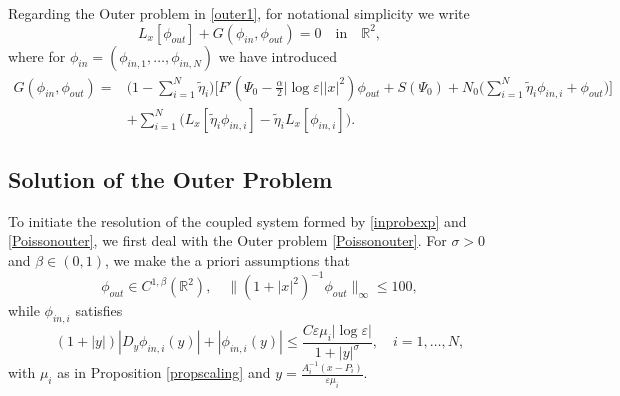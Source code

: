 \documentclass[11pt,reqno,a4paper]{amsart}
\numberwithin{equation}{section}
\newcommand{\R}{\mathbb{R}}
\newcommand{\ve}{\varepsilon}
\begin{document}
\medskip
Regarding the Outer problem in \eqref{outer1}, for notational simplicity we write
\begin{equation}\label{Poissonouter}
L_{x}\left[\phi_{out}\right]+G\left(\phi_{in},\phi_{out}\right)= 0 \quad\mbox{in} \quad\R^2,
\end{equation}
where for $\phi_{in}=(\phi_{in,1},\dots,\phi_{in,N})$ we have introduced 
\begin{equation}\label{Gout}
\begin{aligned}
G\left(\phi_{in},\phi_{out}\right)=&\Big(1-\sum_{i=1}^{N}\tilde{\eta}_i\Big)\bigg[F'\left(\Psi_{0}-\frac{\alpha}{2}|\log\ve||x|^2\right)\phi_{out}+S\left(\Psi_{0}\right)+N_0\Big(\sum_{i=1}^{N}\tilde{\eta}_i\phi_{in,i}+\phi_{out}\Big)\bigg]\\
&+\sum_{i=1}^N\big(L_x[\tilde{\eta}_i\phi_{in,i}]-\tilde{\eta}_iL_x[\phi_{in,i}]\big).
\end{aligned}
\end{equation}
\subsection{Solution of the Outer Problem}\label{subsecouter}
To initiate the resolution of the coupled system formed by \eqref{inprobexp} and \eqref{Poissonouter}, we first deal with the Outer problem \eqref{Poissonouter}. For $\sigma>0$ and $\beta\in(0,1)$, we make the a priori assumptions that 
\begin{equation}\label{b100}
\phi_{out}\in C^{1,\beta}(\R^2), \quad\|(1+|x|^2)^{-1
}\phi_{out}\|_{\infty}\leq 100,
\end{equation}
while $\phi_{in,i}$ satisfies
\begin{equation}\label{propertiesforphi1}
(1+|y|)|D_y \phi_{in,i}(y)|+|\phi_{in,i}(y)| \leq \frac{C\ve\mu_i|\log\ve|}{1+|y|^{\sigma}},\quad i=1,\dots,N,
\end{equation}
with $\mu_i$ as in Proposition \ref{propscaling} and  $y=\frac{A_i^{-1}(x-P_i)}{\ve\mu_i}$.
\end{document}
